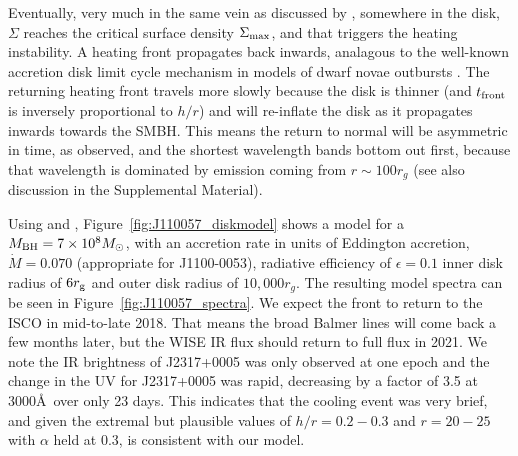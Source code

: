\documentclass{nature}
\begin{document}
Eventually, very much in the same vein as discussed by \cite{Hameury2009}, somewhere in the disk, $\Sigma$ reaches the critical surface density $\Sigma_{\rm max}$, and that triggers the heating instability. A heating front propagates back inwards, analagous to the well-known accretion disk limit cycle mechanism in models of dwarf novae outbursts \cite[e.g.,][]{Cannizzo1998}. The returning heating front travels more slowly because the disk is thinner (and $t_{\rm front}$ is inversely proportional to $h/r$) and will re-inflate the disk as it propagates inwards towards the SMBH. This means the return to normal will be asymmetric in time, as observed, and the shortest wavelength bands bottom out first, because that wavelength is dominated by emission coming from $r\sim100r_{g}$ (see also discussion in the Supplemental Material).

Using \cite{Ford2018} and \cite{Sirko_Goodman2003}, Figure~\ref{fig:J110057_diskmodel} shows a model for a $M_{\rm BH}=7\times 10^{8} M_{\odot}$, with an accretion rate in units of Eddington accretion, $\dot{M}=0.070$ (appropriate for J1100-0053), radiative efficiency of $\epsilon=0.1$ inner disk radius of $6r_{\rm g}$ and outer disk radius of $10,000 r_{g}$. The resulting model spectra can be seen in Figure~\ref{fig:J110057_spectra}. We expect the front to return to the ISCO in mid-to-late 2018. That means the broad Balmer lines will come back a few months later, but the WISE IR flux should return to full flux in 2021. We note the IR brightness of J2317+0005 was only observed at one epoch and the change in the UV for J2317+0005 was rapid, decreasing by a factor of 3.5 at 3000\AA\ over only 23 days. This indicates that the cooling event was very brief, and given the extremal but plausible values of $h/r = 0.2-0.3$ and $r=20-25$ with $\alpha$ held at 0.3, is consistent with our model.



\end{document}

